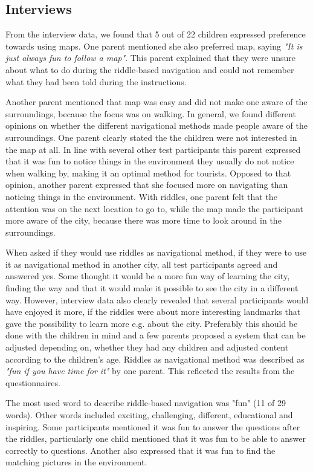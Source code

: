 \subsection{Interviews}
From the interview data, we found that 5 out of 22 children expressed preference towards using maps. One parent mentioned she also preferred map, saying \textit{"It is just always fun to follow a map"}. This parent explained that they were unsure about what to do during the riddle-based navigation and could not remember what they had been told during the instructions. 

Another parent mentioned that map was easy and did not make one aware of the surroundings, because the focus was on walking. In general, we found different opinions on whether the different navigational methods made people aware of the surroundings. One parent clearly stated the the children were not interested in the map at all. In line with several other test participants this parent expressed that it was fun to notice things in the environment they usually do not notice when walking by, making it an optimal method for tourists. Opposed to that opinion, another parent expressed that she focused more on navigating than noticing things in the environment. With riddles, one parent felt that the attention was on the next location to go to, while the map made the participant more aware of the city, because there was more time to look around in the surroundings. 

When asked if they would use riddles as navigational method, if they were to use it as navigational method in another city, all test participants agreed and answered yes. Some thought it would be a more fun way of learning the city, finding the way and that it would make it possible to see the city in a different way. However, interview data also clearly revealed that several participants would have enjoyed it more, if the riddles were about more interesting landmarks that gave the possibility to learn more e.g. about the city. Preferably this should be done with the children in mind and a few parents proposed a system that can be adjusted depending on, whether they had any children and adjusted content according to the children’s age. Riddles as navigational method was described as \textit{"fun if you have time for it"} by one parent. This reflected the results from the questionnaires. 

The most used word to describe riddle-based navigation was "fun" (11 of 29 words). Other words included exciting, challenging, different, educational and inspiring. Some participants mentioned it was fun to answer the questions after the riddles, particularly one child mentioned that it was fun to be able to answer correctly to questions. Another also expressed that it was fun to find the matching pictures in the environment. 

